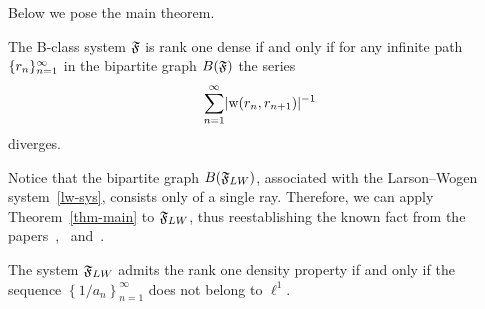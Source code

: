 \documentclass[12pt,oneside,a4paper]{amsart}
\begin{document}
    \medskip
    Below we pose the main theorem.
    \begin{theorem}
      \label{thm-main}
      The B-class system $\mathfrak{F}$ is rank one dense if and only if
        for any infinite path $\{{r}_n\}_{n=1}^\infty$ in the bipartite graph $B(\mathfrak{F})$
        the series
        \[
          \sum_{n=1}^\infty\lvert\mathrm{w}(r_n, r_{n+1})\rvert^{-1}
        \]
        diverges.
    \end{theorem}
    Notice that the bipartite graph $B(\mathfrak{F}_{LW})$, associated with the Larson--Wogen system~\eqref{lw-sys},
      consists only of a single ray.
    Therefore, we can apply Theorem~\ref{thm-main} to $\mathfrak{F}_{LW}$, thus reestablishing
      the known fact from the papers~\cite{katavolos},~\cite{larson} and~\cite{argyroslambrou}.
    \begin{corol*}
      The system $\mathfrak{F}_{LW}$ admits the rank one density property if and only if
        the sequence $\left\{1/a_n\right\}_{n=1}^\infty$ does not belong to $\ell^1$.
    \end{corol*}



\end{document}
